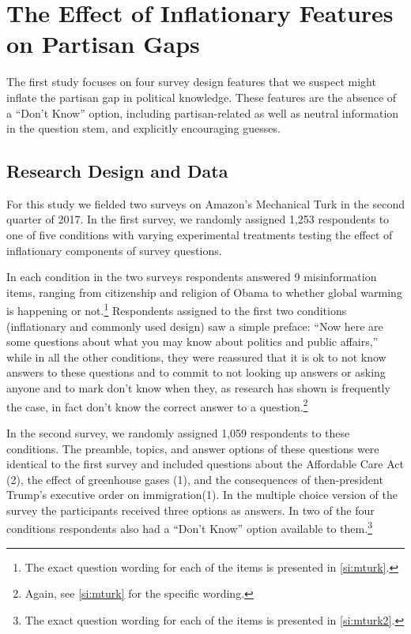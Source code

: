 \documentclass[12pt, letterpaper]{article}
\begin{document}
	
	\section*{The Effect of Inflationary Features on Partisan Gaps}
	\label{sec:inflationary_measures}
	The first study focuses on four survey design features that we suspect might inflate the partisan gap in political knowledge. These features are the absence of a ``Don't Know'' option, including partisan-related as well as neutral information in the question stem, and explicitly encouraging guesses.
	
	\subsection*{Research Design and Data}\label{sec:data1}
	
	For this study we fielded two surveys on Amazon's Mechanical Turk \citep{BerinskyHuberLenz2012} in the second quarter of 2017. In the first survey, we randomly assigned 1,253 respondents to one of five conditions with varying experimental treatments testing the effect of inflationary components of survey questions.
	
	In each condition in the two surveys respondents answered 9 misinformation items, ranging from citizenship and religion of Obama to whether global warming is happening or not.\footnote{The exact question wording for each of the items is presented in \cref{si:mturk}.} Respondents assigned to the first two conditions (inflationary and commonly used design) saw a simple preface: ``Now here are some questions about what you may know about politics and public affairs,'' while in all the other conditions, they were reassured that it is ok to not know answers to these questions and to commit to not looking up answers or asking anyone and to mark don't know when they, as research has shown is frequently the case, in fact don’t know the correct answer to a question.\footnote{Again, see \cref{si:mturk} for the specific wording.}
	
	In the second survey, we randomly assigned 1,059 respondents to these conditions. The preamble, topics, and answer options of these questions were identical to the first survey and included questions about the Affordable Care Act (2), the effect of greenhouse gases (1), and the consequences of then-president Trump's executive order on immigration(1). In the multiple choice version of the survey the participants received three options as answers. In two of the four conditions respondents also had a ``Don't Know'' option available to them.\footnote{The exact question wording for each of the items is presented in \cref{si:mturk2}.}
	
\end{document}
